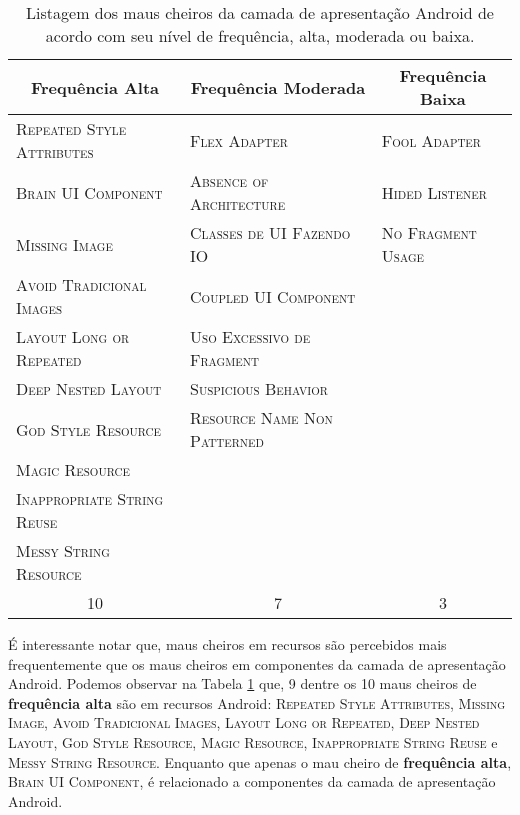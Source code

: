 \begin{table}[!htb]
\centering
\renewcommand*{\arraystretch}{1}
\footnotesize
\caption{Listagem dos maus cheiros da camada de apresentação Android de acordo com seu nível de frequência, alta, moderada ou baixa.}
\begin{tabular}{@{}p{5.2cm}p{5.2cm}p{5.2cm}@{}}
\toprule
\multicolumn{1}{c}{\textbf{Frequência Alta}} & \multicolumn{1}{c}{\textbf{Frequência Moderada}} & \multicolumn{1}{c}{\textbf{Frequência Baixa}} \\
\bottomrule
\textsc{\scriptsize Repeated Style Attributes}  & \textsc{\scriptsize Flex Adapter}               & \textsc{\scriptsize Fool Adapter} \\
\textsc{\scriptsize Brain UI Component}       & \textsc{\scriptsize Absence of Architecture}        & \textsc{\scriptsize Hided Listener} \\
\textsc{\scriptsize Missing Image}                & \textsc{\scriptsize Classes de UI Fazendo IO}       & \textsc{\scriptsize No Fragment Usage} \\
\textsc{\scriptsize Avoid Tradicional Images} & \textsc{\scriptsize Coupled UI Component}      \\
\textsc{\scriptsize Layout Long or Repeated}       & \textsc{\scriptsize Uso Excessivo de Fragment}      \\
\textsc{\scriptsize Deep Nested Layout}  & \textsc{\scriptsize Suspicious Behavior}         \\
\textsc{\scriptsize God Style Resource}        & \textsc{\scriptsize Resource Name Non Patterned} \\
\textsc{\scriptsize Magic Resource}                 \\
\textsc{\scriptsize Inappropriate String Reuse}     \\
\textsc{\scriptsize Messy String Resource}    \\
\toprule
\multicolumn{1}{c}{10} & \multicolumn{1}{c}{7} & \multicolumn{1}{c}{3}\\
\bottomrule
\end{tabular}
\label{tab:SmellFrequency}
\end{table}

É interessante notar que, maus cheiros em recursos são percebidos mais frequentemente que os maus cheiros em componentes da camada de apresentação Android. Podemos observar na Tabela \ref{tab:SmellFrequency} que, 9 dentre os 10 maus cheiros de \textbf{\small frequência alta} são em recursos Android: \textsc{\small Repeated Style Attributes}, \textsc{\small Missing Image}, \textsc{\small Avoid Tradicional Images}, \textsc{\small Layout Long or Repeated}, \textsc{\small Deep Nested Layout}, \textsc{\small God Style Resource}, \textsc{\small Magic Resource}, \textsc{\small Inappropriate String Reuse} e \textsc{\small Messy String Resource}. Enquanto que apenas o mau cheiro de \textbf{\small frequência alta}, \textsc{\small Brain UI Component}, é relacionado a componentes da camada de apresentação Android.

